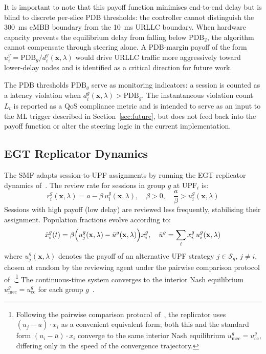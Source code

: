 \documentclass[conference]{IEEEtran}
\begin{document}
It is important to note that this payoff function minimises
end-to-end delay but is blind to discrete per-slice PDB thresholds:
the controller cannot distinguish the 300~ms eMBB boundary from
the 10~ms URLLC boundary. When hardware capacity prevents the
equilibrium delay from falling below $\text{PDB}_2$, the algorithm
cannot compensate through steering alone. A PDB-margin payoff of
the form $u_i^g = \text{PDB}_g / d_i^g(\mathbf{x},\lambda)$ would
drive URLLC traffic more aggressively toward lower-delay nodes and
is identified as a critical direction for future work.

The PDB thresholds $\text{PDB}_g$ serve as monitoring
indicators: a session is counted as a latency violation
when $d_i^g(\mathbf{x},\lambda) > \text{PDB}_g$.
The instantaneous violation count $L_t$ is reported as
a QoS compliance metric and is intended to serve as an
input to the ML trigger described in
Section~\ref{sec:future}, but does not feed back into
the payoff function or alter the steering logic in the
current implementation.

\subsection{EGT Replicator Dynamics}
\label{sec:egt}

The SMF adapts session-to-UPF assignments by running the
EGT replicator dynamics of~\cite{Alevizaki2021upf}.
The review rate for sessions in group $g$ at
$\text{UPF}_i$ is:
\begin{equation}
    r_i^g(\mathbf{x},\lambda) =
    a - \beta\,u_i^g(\mathbf{x},\lambda),
    \quad \beta > 0,\quad
    \frac{a}{\beta} > u_i^g(\mathbf{x},\lambda)
    \label{eq:revrate}
\end{equation}
Sessions with high payoff (low delay) are reviewed less
frequently, stabilising their assignment. Population
fractions evolve according to:
\begin{equation}
    \dot{x}_i^g(t) = \beta\Bigl(u_j^g(\mathbf{x},\lambda)
    - \bar{u}^g(\mathbf{x},\lambda)\Bigr)x_i^g, \quad
    \bar{u}^g = \sum_i x_i^g\,u_i^g(\mathbf{x},\lambda)
    \label{eq:replicator}
\end{equation}
where $u_j^g(\mathbf{x},\lambda)$ denotes the payoff of
an alternative UPF strategy $j \in \mathcal{S}_g$,
$j \neq i$, chosen at random by the reviewing agent
under the pairwise comparison protocol
of~\cite{Alevizaki2021upf}.\footnote{Following the pairwise
comparison protocol of~\cite{Alevizaki2021upf}, the replicator
uses $(u_j - \bar{u})\cdot x_i$ as a convenient equivalent
form; both this and the standard form $(u_i - \bar{u})\cdot x_i$
converge to the same interior Nash equilibrium
$u_\text{mec}^g = u_\text{cc}^g$, differing only in the speed
of the convergence trajectory.}
The continuous-time system converges to the interior
Nash equilibrium $u_\text{mec}^g = u_\text{cc}^g$ for
each group $g$~\cite{Alevizaki2021upf}.
\end{document}
